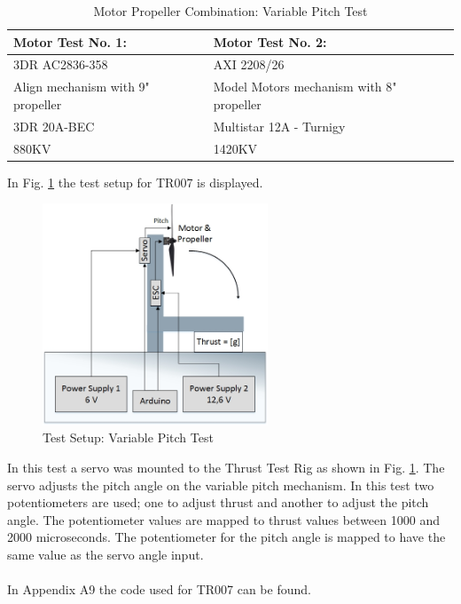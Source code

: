 \begin {table}[H]
    \begin{center}
    \caption {Motor Propeller Combination: Variable Pitch Test} 
    \label{tab:tabt9} 
    \begin{tabular}{|l|l|}\hline 
        Motor Test No. 1: & Motor Test No. 2:  \\ \hline
        3DR AC2836-358  & AXI 2208/26 \\ \hline
        Align mechanism with 9" propeller & Model Motors mechanism with 8" propeller \\ \hline
        3DR 20A-BEC & Multistar 12A - Turnigy \\ \hline
        880KV & 1420KV \\ \hline
        \end{tabular}
    \end{center}
\end{table}
\newpage
\noindent In Fig. \ref{fig:VPM} the test setup for TR007 is displayed.
\begin{figure}[H]
    \centering
    \includegraphics[width = 0.6\textwidth]{VAPIQ-PICTURES/TestSetupGramsPerW}
    \caption{Test Setup: Variable Pitch Test}
    \label{fig:VPM}
\end{figure}
\noindent
In this test a servo was mounted to the Thrust Test Rig as shown in Fig. \ref{fig:VPM}. The servo adjusts the pitch angle on the variable pitch mechanism. In this test two potentiometers are used; one to adjust thrust and another to adjust the pitch angle. The potentiometer values are mapped to thrust values between 1000 and 2000 microseconds. The potentiometer for the pitch angle is mapped to have the same value as the servo angle input.\\
\\
In Appendix A9 the code used for TR007 can be found. 


